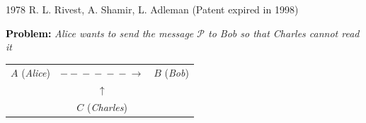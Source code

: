 \documentclass[landscape,handout]{powersem} %
\newcommand{\heading}[1]{%
 \begin{center}
  \large\bf
  \shadowbox{{\textcolor{conceptcolor}{#1}}}%
 \end{center}
 \vspace{1ex minus 1ex}}
\begin{document}
\begin{slide}
\heading{The RSA cryptosystem}\pause

1978 R. L. Rivest, A. Shamir, L. Adleman (Patent expired in
1998)\pause

\textbf{\textcolor{black}{Problem:}} \emph{Alice wants to send the
message $\mathcal P$ to Bob so that Charles cannot read it}\pause

\begin{center}\begin{large}
\begin{tabular}{|lcr|}\hline
  $A$ (\textsl{Alice}) & $-\!\!\!-\!\!\!-\!\!\!-\!\!\!-\!\!\!-\!\!\!\rightarrow$ & $B$ (\textsl{Bob})\\
   & $\uparrow$ &  \\
   & $C$ (\textsl{Charles}) &  \\ \hline\end{tabular}
\end{large}\end{center}\pause

\end{slide}
\end{document}
